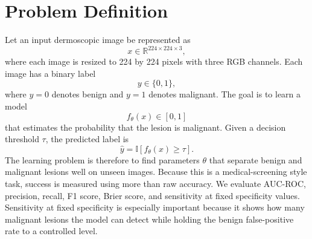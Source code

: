 \documentclass{article}
\begin{document}
\section{Problem Definition}
Let an input dermoscopic image be represented as
\[
x \in \mathbb{R}^{224 \times 224 \times 3},
\]
where each image is resized to 224 by 224 pixels with three RGB channels. Each image has a binary
label
\[
y \in \{0,1\},
\]
where $y=0$ denotes benign and $y=1$ denotes malignant. The goal is to learn a model
\[
f_{\theta}(x) \in [0,1]
\]
that estimates the probability that the lesion is malignant. Given a decision threshold $\tau$, the
predicted label is
\[
\hat{y} = \mathbb{I}[f_{\theta}(x) \ge \tau].
\]
The learning problem is therefore to find parameters $\theta$ that separate benign and malignant
lesions well on unseen images. Because this is a medical-screening style task, success is measured
using more than raw accuracy. We evaluate AUC-ROC, precision, recall, F1 score, Brier score, and
sensitivity at fixed specificity values. Sensitivity at fixed specificity is especially important because
it shows how many malignant lesions the model can detect while holding the benign false-positive
rate to a controlled level.
\end{document}
